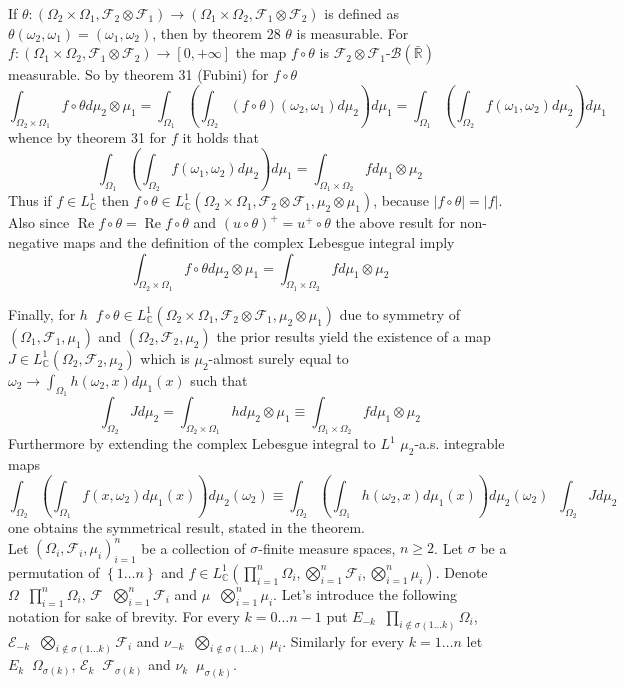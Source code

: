 \documentclass[a4paper]{article}
\newcommand{\obj}[1]{\left\{ #1 \right \}}
\newcommand{\clo}[1]{\left [ #1 \right ]}
\newcommand{\brac}[1]{\left ( #1 \right )}
\newcommand{\abs}[1]{\left | #1 \right |}
\newcommand{\Rbar}{{\bar{\mathbb{R}}}}
\newcommand{\Zinf}{\clo{ 0, +\infty }}
\newcommand{\Cplx}{\mathbb{C}}
\newcommand{\Ecal}{\mathcal{E}}
\newcommand{\Fcal}{\mathcal{F}}
\newcommand{\borel}[1]{\mathcal{B}\brac{#1}}
\newcommand{\defn}{\mathop{\overset{\Delta}{=}}\nolimits}
\newcommand{\re}{\operatorname{Re}\nolimits}
\begin{document}
If $\theta:\brac{\Omega_2\times\Omega_1, \Fcal_2\otimes\Fcal_1} \to \brac{\Omega_1\times\Omega_2, \Fcal_1\otimes\Fcal_2}$ is defined as $\theta\brac{\omega_2, \omega_1}=\brac{\omega_1, \omega_2}$, then by theorem 28 $\theta$ is measurable. For  $f:\brac{\Omega_1\times\Omega_2, \Fcal_1\otimes\Fcal_2}\to \Zinf$ the map $f\circ \theta$ is $\Fcal_2\otimes\Fcal_1$-$\borel{\Rbar}$ measurable. So by theorem 31 (Fubini) for $f\circ \theta$ \[\int_{\Omega_2\times\Omega_1} f\circ \theta d\mu_2\otimes\mu_1 = \int_{\Omega_1} \brac{ \int_{\Omega_2} \brac{f\circ \theta}\brac{\omega_2, \omega_1} d\mu_2 }d\mu_1 = \int_{\Omega_1} \brac{ \int_{\Omega_2} f\brac{\omega_1, \omega_2} d\mu_2 }d\mu_1\] whence by theorem 31 for $f$ it holds that \[\int_{\Omega_1} \brac{ \int_{\Omega_2} f\brac{\omega_1, \omega_2} d\mu_2 }d\mu_1 = \int_{\Omega_1\times\Omega_2} f d\mu_1\otimes\mu_2\] Thus if $f\in L^1_\Cplx$ then $f\circ \theta \in L^1_\Cplx\brac{\Omega_2\times\Omega_1, \Fcal_2\otimes\Fcal_1, \mu_2\otimes\mu_1}$, because $\abs{f \circ \theta} = \abs{f}$. Also since $\re{f\circ \theta} =\re{f}\circ \theta$ and $\brac{u\circ \theta}^+ = u^+ \circ \theta$ the above result for non-negative maps and the definition of the complex Lebesgue integral imply \[\int_{\Omega_2\times\Omega_1} f\circ \theta d\mu_2\otimes\mu_1 = \int_{\Omega_1\times\Omega_2} f d\mu_1\otimes\mu_2\]

Finally, for $h \defn f\circ \theta \in L^1_\Cplx\brac{\Omega_2\times\Omega_1, \Fcal_2\otimes\Fcal_1, \mu_2\otimes\mu_1}$ due to symmetry of $\brac{\Omega_1, \Fcal_1, \mu_1}$ and $\brac{\Omega_2, \Fcal_2, \mu_2}$ the prior results yield the existence of a map $J\in L^1_\Cplx\brac{\Omega_2, \Fcal_2, \mu_2}$ which is $\mu_2$-almost surely equal to $\omega_2\to\int_{\Omega_1} h\brac{\omega_2, x} d\mu_1\brac{x}$ such that \[\int_{\Omega_2} J d\mu_2 = \int_{\Omega_2\times\Omega_1} h d\mu_2\otimes\mu_1 \equiv \int_{\Omega_1\times\Omega_2} f d\mu_1\otimes\mu_2 \] Furthermore by extending the complex Lebesgue integral to $L^1$ $\mu_2$-a.s. integrable maps \[\int_{\Omega_2} \brac{ \int_{\Omega_1} f\brac{ x, \omega_2 } d\mu_1\brac{x} } d\mu_2\brac{\omega_2} \equiv \int_{\Omega_2} \brac{ \int_{\Omega_1} h\brac{ \omega_2, x } d\mu_1\brac{x} } d\mu_2\brac{\omega_2}\defn \int_{\Omega_2} J d\mu_2\] one obtains the symmetrical result, stated in the theorem.\\


Let $\brac{\Omega_i, \Fcal_i, \mu_i}_{i=1}^n$ be a collection of $\sigma$-finite measure spaces, $n\geq 2$. Let $\sigma$ be a permutation of $\obj{1\ldots n}$ and $f\in L^1_\Cplx\brac{ \prod_{i=1}^n \Omega_i, \bigotimes_{i=1}^n \Fcal_i, \bigotimes_{i=1}^n \mu_i}$. Denote $\Omega \defn \prod_{i=1}^n \Omega_i$, $\Fcal \defn \bigotimes_{i=1}^n \Fcal_i$ and $\mu \defn \bigotimes_{i=1}^n \mu_i$. Let's introduce the following notation for sake of brevity. For every $k = 0\ldots n-1$ put $E_{-k} \defn \prod_{i\notin \sigma\brac{1\ldots k}} \Omega_i$, $\Ecal_{-k} \defn \bigotimes_{i\notin \sigma\brac{1\ldots k}} \Fcal_i$ and $\nu_{-k}\defn \bigotimes_{i\notin \sigma\brac{1\ldots k}} \mu_i$. Similarly for every $k=1\ldots n$ let $E_k \defn \Omega_{\sigma\brac{k}}$, $\Ecal_k \defn \Fcal_{\sigma\brac{k}}$ and $\nu_k\defn \mu_{\sigma\brac{k}}$.
\end{document}
